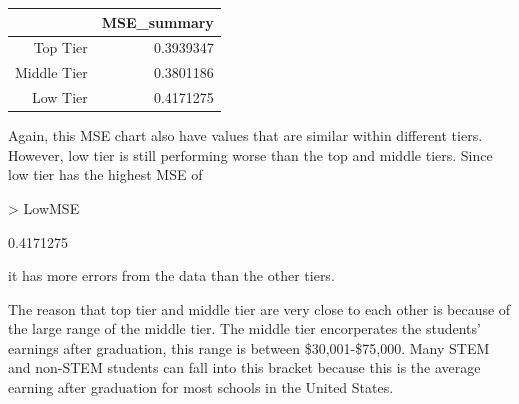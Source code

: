 \documentclass{article}
\begin{document}
\begin{table}[ht]
\centering
\begin{tabular}{rr}
  \hline
 & MSE\_summary \\ 
  \hline
Top Tier & 0.3939347 \\ 
  Middle Tier & 0.3801186 \\ 
  Low Tier & 0.4171275 \\ 
   \hline
\end{tabular}
\end{table}Again, this MSE chart also have values that are similar within different tiers. However, low tier is still performing worse than the top and middle tiers. Since low tier has the highest MSE of 
\begin{Schunk}
\begin{Sinput}
> LowMSE
\end{Sinput}
\begin{Soutput}
[1] 0.4171275
\end{Soutput}
\end{Schunk}
it has more errors from the data than the other tiers. 


The reason that top tier and middle tier are very close to each other is because of the large range of the middle tier. The middle tier encorperates the students' earnings after graduation, this range is between \$30,001-\$75,000. Many STEM and non-STEM students can fall into this bracket because this is the average earning after graduation for most schools in the United States.  
\newline
\end{document}
